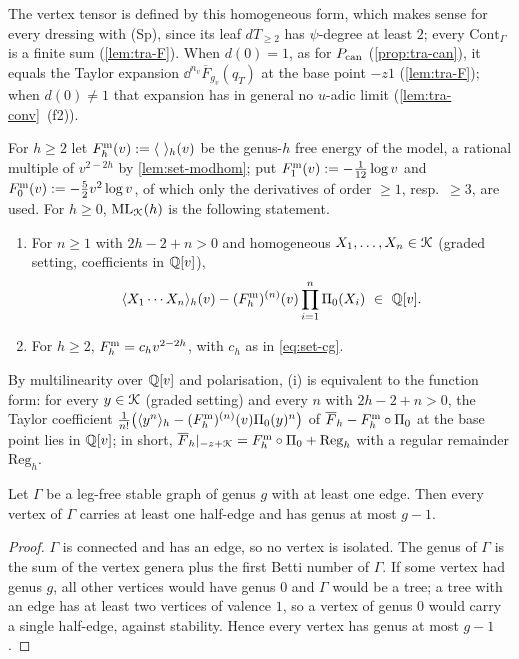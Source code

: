The vertex tensor is defined by this homogeneous form, which makes sense for every dressing with (Sp), since its leaf $dT_{\geq 2}$ has $\psi$-degree at least $2$; every $\mathrm{Cont}_\Gamma$ is a finite sum (\cref{lem:tra-F}). When $d(0) = 1$, as for $P_{\mathrm{can}}$ (\cref{prop:tra-can}), it equals the Taylor expansion $\dd^{n_v}\overline F_{g_v}(q_T)$ at the base point $-z1$ (\cref{lem:tra-F}); when $d(0)\neq 1$ that expansion has in general no $u$-adic limit (\cref{lem:tra-conv}~(f2)).

\begin{defn}
\label{def:red-ML}
For $h\geq 2$ let $F^{\mathrm{m}}_h(v) := \langle\ \rangle_h(v)$ be the genus-$h$ free energy of the model, a rational multiple of $v^{2-2h}$ by \cref{lem:set-modhom}; put $F^{\mathrm{m}}_1(v) := -\frac{1}{12}\log v$ and $F^{\mathrm{m}}_0(v) := -\frac52v^2\log v$, of which only the derivatives of order $\geq 1$, resp.\ $\geq 3$, are used. For $h\geq 0$, $\mathrm{ML}_{\mathcal{K}}(h)$ is the following statement.
\begin{enumerate}
\item For $n\geq 1$ with $2h-2+n>0$ and homogeneous $X_1,\dots,X_n\in\mathcal{K}$ (graded setting, coefficients in $\mathbb{Q}[v]$),
\[
\langle X_1\cdots X_n\rangle_h(v)-(F^{\mathrm{m}}_h)^{(n)}(v)\prod_{i=1}^n\Pi_0(X_i)\ \in\ \mathbb{Q}[v] .
\]
\item For $h\geq 2$, $F^{\mathrm{m}}_h = c_hv^{2-2h}$, with $c_h$ as in \eqref{eq:set-cg}.
\end{enumerate}
By multilinearity over $\mathbb{Q}[v]$ and polarisation, (i) is equivalent to the function form: for every $y\in\mathcal{K}$ (graded setting) and every $n$ with $2h-2+n>0$, the Taylor coefficient $\frac1{n!}\bigl(\langle y^n\rangle_h-(F^{\mathrm{m}}_h)^{(n)}(v)\Pi_0(y)^n\bigr)$ of $\overline F_h-F^{\mathrm{m}}_h\circ\Pi_0$ at the base point lies in $\mathbb{Q}[v]$; in short, $\overline F_h|_{-z+\mathcal{K}} = F^{\mathrm{m}}_h\circ\Pi_0+\mathrm{Reg}_h$ with a regular remainder $\mathrm{Reg}_h$.
\end{defn}

\begin{lem}
\label{lem:red-genus}
Let $\Gamma$ be a leg-free stable graph of genus $g$ with at least one edge. Then every vertex of $\Gamma$ carries at least one half-edge and has genus at most $g-1$.
\end{lem}

\begin{proof}
$\Gamma$ is connected and has an edge, so no vertex is isolated. The genus of $\Gamma$ is the sum of the vertex genera plus the first Betti number of $\Gamma$. If some vertex had genus $g$, all other vertices would have genus $0$ and $\Gamma$ would be a tree; a tree with an edge has at least two vertices of valence $1$, so a vertex of genus $0$ would carry a single half-edge, against stability. Hence every vertex has genus at most $g-1$.
\end{proof}

